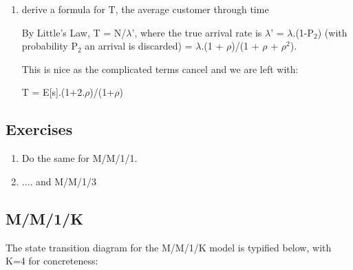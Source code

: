 \documentclass[12pt,fleqn]{report}
\begin{document}
\begin{enumerate}
N$_q$ = 0.P$_0$ + 0.P$_1$ + 1.P$_2$ = P$_2$ = $\rho^2$/(1 + $\rho$ + $\rho^2$)


\item derive a formula for T, the average customer through time 

By Little's Law, T = N/$\lambda$', where the true arrival rate is
$\lambda$' = $\lambda$.(1-P$_2$) 
(with probability P$_2$ an arrival is discarded) 
= $\lambda$.(1 + $\rho$)/(1 + $\rho$  + $\rho^2$).

This is nice as the complicated terms cancel and we are left with:

T = E[s].(1+2.$\rho$)/(1+$\rho$)


\end{enumerate}

\subsection*{Exercises}


\begin{enumerate}

\item Do the same for M/M/1/1.

\item .... and M/M/1/3

\end{enumerate}


\subsection{M/M/1/K}

The state transition diagram for the M/M/1/K model is
typified below, with K=4 for concreteness:
\end{document}
